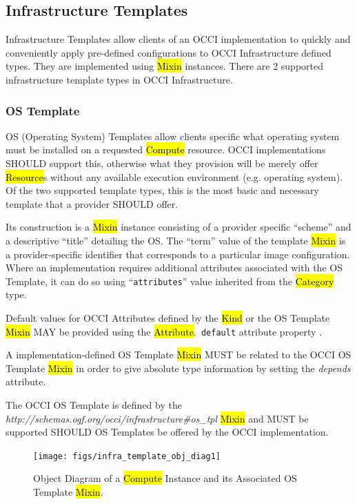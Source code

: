 \documentclass[10pt,a4paper]{article}
\begin{document}
\subsection{Infrastructure Templates}
Infrastructure Templates allow clients of an OCCI implementation to
quickly and conveniently apply pre-defined configurations to OCCI
Infrastructure defined types. They are implemented using \hl{Mixin}
instances. There are 2 supported infrastructure template types in OCCI
Infrastructure.

\subsubsection{OS Template}
OS (Operating System) Templates allow clients specific what operating
system must be installed on a requested \hl{Compute} resource. OCCI
implementations SHOULD support this, otherwise what they provision
will be merely offer \hl{Resource}s without any available execution
environment (e.g. operating system). Of the two supported template
types, this is the most basic and necessary template that a provider
SHOULD offer.

Its construction is a \hl{Mixin} instance consisting of a provider
specific ``scheme'' and a descriptive ``title'' detailing the OS. The
``term'' value of the template \hl{Mixin} is a provider-specific
identifier that corresponds to a particular image configuration. Where
an implementation requires additional attributes associated with the
OS Template, it can do so using ``{\tt attributes}'' value inherited
from the \hl{Category} type.

Default values for OCCI Attributes defined by the \hl{Kind} or the OS
Template \hl{Mixin} MAY be provided using the \hl{Attribute}.{\tt
  default} attribute property \cite{occi:core}.

A implementation-defined OS Template \hl{Mixin} MUST be related to the
OCCI OS Template \hl{Mixin} in order to give absolute type
information by setting the \textit{depends} attribute.

The OCCI OS Template is defined by the
\textit{http://schemas.ogf.org/occi/infrastructure\#os\_tpl}
\hl{Mixin} and MUST be supported SHOULD OS Templates be offered by the
OCCI implementation.

\begin{figure}[!h]
	\centering
	\texttt{[image: figs/infra\_template\_obj\_diag1]}
	\caption{Object Diagram of a \hl{Compute} Instance and its Associated OS Template \hl{Mixin}.}
	\label{fig:infra_template_obj_diag1}
\end{figure}
\end{document}
